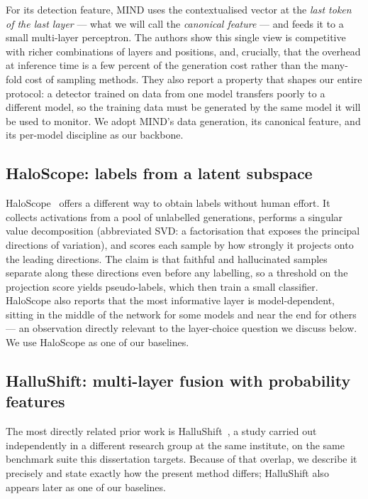 For its detection feature, MIND uses the contextualised vector at the \emph{last token of
the last layer} --- what we will call the \emph{canonical feature} --- and feeds it to a
small multi-layer perceptron. The authors show this single view is competitive with
richer combinations of layers and positions, and, crucially, that the overhead at
inference time is a few percent of the generation cost rather than the many-fold cost of
sampling methods. They also report a property that shapes our entire protocol: a detector
trained on data from one model transfers poorly to a different model, so the training
data must be generated by the same model it will be used to monitor. We adopt MIND's data
generation, its canonical feature, and its per-model discipline as our backbone.

\subsection{HaloScope: labels from a latent subspace}

HaloScope~\cite{du2024haloscope} offers a different way to obtain labels without human
effort. It collects activations from a pool of unlabelled generations, performs a
singular value decomposition (abbreviated SVD: a factorisation that exposes the principal
directions of variation), and scores each sample by how strongly it projects onto the
leading directions. The claim is that faithful and hallucinated samples separate along
these directions even before any labelling, so a threshold on the projection score yields
pseudo-labels, which then train a small classifier. HaloScope also reports that the most
informative layer is model-dependent, sitting in the middle of the network for some
models and near the end for others --- an observation directly relevant to the
layer-choice question we discuss below. We use HaloScope as one of our baselines.

\subsection{HalluShift: multi-layer fusion with probability features}

The most directly related prior work is HalluShift~\cite{dasgupta2025hallushift}, a study
carried out independently in a different research group at the same institute, on the same
benchmark suite this dissertation targets. Because of that overlap, we describe it
precisely and state exactly how the present method differs; HalluShift also appears later
as one of our baselines.

